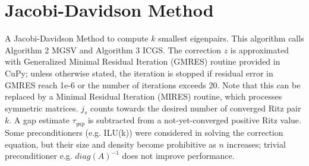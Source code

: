 \documentclass[a4paper]{article}
\begin{document}
\pagebreak
\section{Jacobi-Davidson Method}

A Jacobi-Davidson Method to compute $k$ smallest eigenpairs. This algorithm calls Algorithm 2 MGSV and Algorithm 3 ICGS. The correction $z$ is approximated with Generalized Minimal Residual Iteration (GMRES) routine provided in CuPy; unless otherwise stated, the iteration is stopped if residual error in GMRES reach 1e-6 or the number of iterations exceeds 20. Note that this can be replaced by a Minimal Residual Iteration (MIRES) routine, which processes symmetric matrices. $j_s$ counts towards the desired number of converged Ritz pair $k$. A gap estimate $\tau_{gap}$ is subtracted from a not-yet-converged positive Ritz value. Some preconditioners (e.g. ILU(k)) were considered in solving the correction equation, but their size and density become prohibitive as $n$ increases; trivial preconditioner e.g. $diag(A)^{-1}$ does not improve performance.
\end{document}
